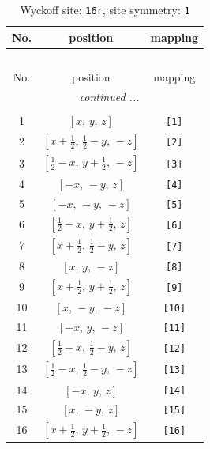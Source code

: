\documentclass[fleqn,8pt]{jsarticle}
\begin{document}
\begin{longtable}{ccc}
\caption{Wyckoff site: {\tt 16r}, site symmetry: {\tt 1}}
 \\
 \hline \hline
No. & position & mapping \\ \hline \endfirsthead

\multicolumn{2}{l}{\tablename\ \thetable{}} \\
 \hline \hline
No. & position & mapping \\ \hline \endhead

 \hline \hline
\multicolumn{2}{r}{\footnotesize\it continued ...} \\ \endfoot

 \hline \hline
\multicolumn{2}{r}{} \\ \endlastfoot

1 & $\left[ x,\, y,\, z \right]$ & {\tt [1]} \\ \hline
2 & $\left[ x + \frac{1}{2},\, \frac{1}{2} - y,\, - z \right]$ & {\tt [2]} \\ \hline
3 & $\left[ \frac{1}{2} - x,\, y + \frac{1}{2},\, - z \right]$ & {\tt [3]} \\ \hline
4 & $\left[ - x,\, - y,\, z \right]$ & {\tt [4]} \\ \hline
5 & $\left[ - x,\, - y,\, - z \right]$ & {\tt [5]} \\ \hline
6 & $\left[ \frac{1}{2} - x,\, y + \frac{1}{2},\, z \right]$ & {\tt [6]} \\ \hline
7 & $\left[ x + \frac{1}{2},\, \frac{1}{2} - y,\, z \right]$ & {\tt [7]} \\ \hline
8 & $\left[ x,\, y,\, - z \right]$ & {\tt [8]} \\ \hline
9 & $\left[ x + \frac{1}{2},\, y + \frac{1}{2},\, z \right]$ & {\tt [9]} \\ \hline
10 & $\left[ x,\, - y,\, - z \right]$ & {\tt [10]} \\ \hline
11 & $\left[ - x,\, y,\, - z \right]$ & {\tt [11]} \\ \hline
12 & $\left[ \frac{1}{2} - x,\, \frac{1}{2} - y,\, z \right]$ & {\tt [12]} \\ \hline
13 & $\left[ \frac{1}{2} - x,\, \frac{1}{2} - y,\, - z \right]$ & {\tt [13]} \\ \hline
14 & $\left[ - x,\, y,\, z \right]$ & {\tt [14]} \\ \hline
15 & $\left[ x,\, - y,\, z \right]$ & {\tt [15]} \\ \hline
16 & $\left[ x + \frac{1}{2},\, y + \frac{1}{2},\, - z \right]$ & {\tt [16]} \\
\end{longtable}
\end{document}
